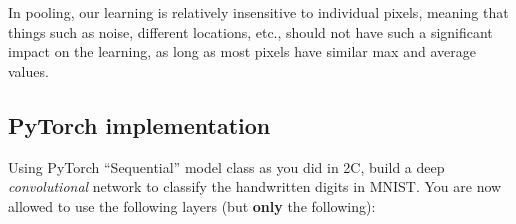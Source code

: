 \begin{subsolution}
 In pooling, our learning is relatively insensitive to individual pixels, meaning that things such as noise, different locations, etc., should not have such a significant impact on the learning, as long as most pixels have similar max and average values.
\end{subsolution}

\subsection{PyTorch implementation}
\problem[20]

Using PyTorch ``Sequential'' model class as you did in 2C, build a deep \emph{convolutional}
network to classify the handwritten digits in MNIST. You are now allowed to use
the following layers (but \textbf{only} the following):

